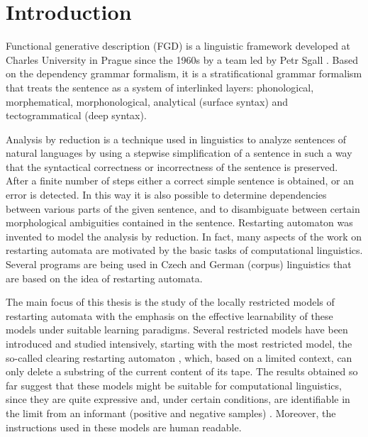 \chapter*{Introduction}

Functional generative description (FGD) is a linguistic framework developed at Charles University in Prague since the 1960s by a team led by Petr Sgall \cite{SgNeGoHa69}. Based on the dependency grammar formalism, it is a stratificational grammar formalism that treats the sentence as a system of interlinked layers: phonological, morphematical, morphonological, analytical (surface syntax) and tectogrammatical (deep syntax).

Analysis by reduction \cite{LoPlKu05} is a technique used in linguistics to analyze sentences of natural languages by using a stepwise simplification of a sentence in such a way that the syntactical correctness or incorrectness of the sentence is preserved. After a finite number of steps either a correct simple sentence is obtained, or an error is detected. In this way it is also possible to determine dependencies between various parts of the given sentence, and to disambiguate between certain morphological ambiguities contained in the sentence. Restarting automaton \cite{JMPV95,O06} was invented to model the analysis by reduction. In fact, many aspects of the work on restarting automata are motivated by the basic tasks of computational linguistics. Several programs are being used in Czech and German (corpus) linguistics that are based on the idea of restarting automata. 

The main focus of this thesis is the study of the locally restricted models of restarting automata with the emphasis on the effective learnability of these models under suitable learning paradigms. Several restricted models have been introduced and studied intensively, starting with the most restricted model, the so-called clearing restarting automaton \cite{CM10}, which, based on a limited context, can only delete a substring of the current content of its tape. The results obtained so far suggest that these models might be suitable for computational linguistics, since they are quite expressive and, under certain conditions, are identifiable in the limit from an informant (positive and negative samples) \cite{C12}. Moreover, the instructions used in these models are human readable.